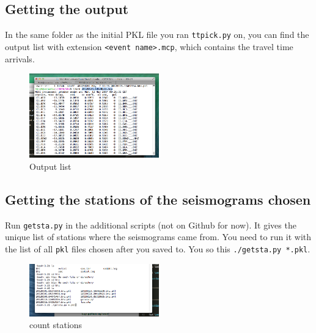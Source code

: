 \documentclass[letterpaper,10pt]{article}
\begin{document}
\subsection{Getting the output}

In the same folder as the initial PKL file you ran \texttt{ttpick.py} on, you can find the output list with extension \texttt{<event name>.mcp}, which contains the travel time arrivals. 

\begin{figure}[h!]
  \centering
  \includegraphics[width=0.5\textwidth]{images/output_list}
  \caption{Output list}
  \label{fig:output_list}
\end{figure}

\subsection{Getting the stations of the seismograms chosen}

Run \verb"getsta.py" in the additional scripts (not on Github for now). It gives the unique list of stations where the seismograms came from. You need to run it with the list of all \verb"pkl" files chosen after you saved to. You so this \verb"./getsta.py *.pkl". 

\begin{figure}[h!]
  \centering
  \includegraphics[width=0.5\textwidth]{images/count_stations}
  \caption{count stations}
  \label{fig:count_stations}
\end{figure}
\end{document}
